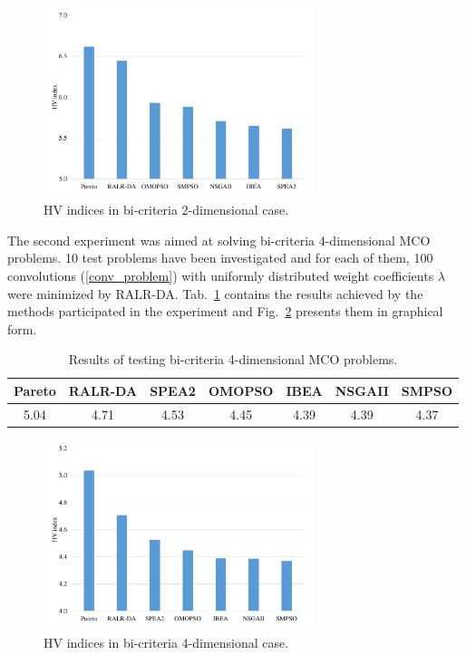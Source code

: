 \documentclass[runningheads]{llncs}
\begin{document}
\begin{figure}
\centering
\includegraphics[width=0.7\textwidth]{fig3.pdf} 
\caption{HV indices in bi-criteria 2-dimensional case.}\label{fig3} 
\end{figure}

The second experiment was aimed at solving bi-criteria 4-dimensional MCO problems. 10 test problems have been investigated and for each of them, 100 convolutions (\ref{conv_problem}) with uniformly distributed weight coefficients $\lambda$ were minimized by RALR-DA. 
Tab.~\ref{tab2} contains the results achieved by the methods participated in the experiment and Fig.~\ref{fig4} presents them in graphical form.

\begin{table}
\caption{Results of testing bi-criteria 4-dimensional MCO problems.}
\centering
\begin{tabular}{ccccccc} \hline
 Pareto & RALR-DA & SPEA2 & OMOPSO & IBEA & NSGAII & SMPSO   \\ \hline
  5.04 & 4.71 & 4.53 & 4.45 & 4.39 & 4.39 & 4.37 \\ \hline
\end{tabular}
\label{tab2}
\end{table}

\begin{figure}
\centering
\includegraphics[width=0.7\textwidth]{fig4.pdf} 
\caption{HV indices in bi-criteria 4-dimensional case.}\label{fig4} 
\end{figure}
\end{document}
